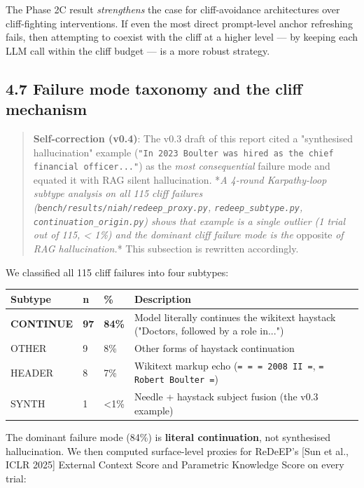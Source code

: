 \documentclass[11pt]{article}
\begin{document}
The Phase 2C result \textit{strengthens} the case for cliff-avoidance architectures over cliff-fighting interventions. If even the most direct prompt-level anchor refreshing fails, then attempting to coexist with the cliff at a higher level — by keeping each LLM call within the cliff budget — is a more robust strategy.


\subsection*{4.7 Failure mode taxonomy and the cliff mechanism}


\begin{quote}
\textbf{Self-correction (v0.4)}: The v0.3 draft of this report cited a "synthesised hallucination" example (\texttt{"In 2023 Boulter was hired as the chief financial officer..."}) as the \textit{most consequential} failure mode and equated it with RAG silent hallucination. *\textit{A 4-round Karpathy-loop subtype analysis on all 115 cliff failures (\texttt{bench/results/niah/redeep\_proxy.py}, \texttt{redeep\_subtype.py}, \texttt{continuation\_origin.py}) shows that example is a single outlier (1 trial out of 115, < 1\%) and the dominant cliff failure mode is the }opposite\textit{ of RAG hallucination.}* This subsection is rewritten accordingly.
\end{quote}


We classified all 115 cliff failures into four subtypes:


\begin{center}
\begin{tabular}{llll}
\toprule
Subtype & n & \% & Description \\
\midrule
\textbf{CONTINUE} & \textbf{97} & \textbf{84\%} & Model literally continues the wikitext haystack ("Doctors, followed by a role in...") \\
OTHER & 9 & 8\% & Other forms of haystack continuation \\
HEADER & 8 & 7\% & Wikitext markup echo (\texttt{= = = 2008 II =}, \texttt{= Robert Boulter =}) \\
SYNTH & 1 & <1\% & Needle + haystack subject fusion (the v0.3 example) \\
\bottomrule
\end{tabular}
\end{center}


The dominant failure mode (84\%) is \textbf{literal continuation}, not synthesised hallucination. We then computed surface-level proxies for ReDeEP's [Sun et al., ICLR 2025] External Context Score and Parametric Knowledge Score on every trial:
\end{document}
